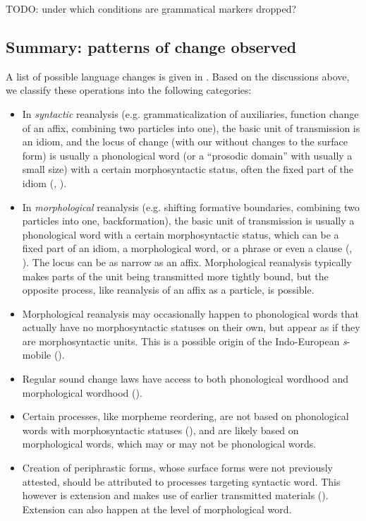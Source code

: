 \documentclass[a4paper, oneside, scheme=plain, 12pt]{article}
\newcommand*{\citechaps}[1]{Chs.~{#1}}
\newcommand{\form}[1]{\emph{#1}}
\begin{document}
TODO: under which conditions are grammatical markers dropped? 

\subsection{Summary: patterns of change observed}\label{sec:all-changes}

A list of possible language changes is given in \citet[\citechaps{10-11}]{campbell2013historical}.
Based on the discussions above, we classify these operations into the following categories:

\begin{itemize}
    \item In \emph{syntactic} reanalysis (e.g. grammaticalization of auxiliaries,
    function change of an affix, combining two particles into one),
    the basic unit of transmission is an idiom, 
    and the locus of change (with our without changes to the surface form)
    is usually a phonological word (or a ``prosodic domain'' with usually a small size)
    with a certain morphosyntactic status,
    often the fixed part of the idiom (, ).
    \item In \emph{morphological} reanalysis (e.g. shifting formative boundaries, combining two particles into one, backformation),
    the basic unit of transmission is usually a phonological word with a certain morphosyntactic status,
    which can be a fixed part of an idiom, a morphological word,
    or a phrase or even a clause (, ).
    The locus can be as narrow as an affix.
    Morphological reanalysis typically makes parts of the unit being transmitted more tightly bound,
    but the opposite process, like reanalysis of an affix as a particle, is possible.
    \item Morphological reanalysis may occasionally happen to phonological words that actually
    have no morphosyntactic statuses on their own,
    but appear as if they are morphosyntactic units.
    This is a possible origin of the Indo-European \form{s}-mobile ().
    \item Regular sound change laws have access to both phonological wordhood and morphological wordhood ().
    \item Certain processes, like morpheme reordering, are not based on phonological words with morphosyntactic statuses (),
    and are likely based on morphological words, which may or may not be phonological words.
    \item Creation of periphrastic forms, whose surface forms were not previously attested,
    should be attributed to processes targeting syntactic word.
    This however is extension and makes use of earlier transmitted materials ().
    Extension can also happen at the level of morphological word.
\end{itemize}
\end{document}
